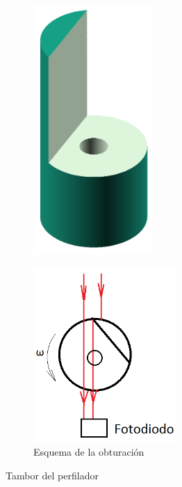 \begin{figure}[H]
    \begin{subfigure}[b]{0.45\textwidth}
        \centering
        \includegraphics[width=0.5\textwidth]{fig/perfilador/tambor}
        \caption{}
        \label{fig:perfilador/tambor}
    \end{subfigure}
    \begin{subfigure}[b]{0.45\textwidth}
        \centering
        \includegraphics[width=0.6\textwidth]{fig/perfilador/corte_tambor}
        \caption{Esquema de la obturación}
        \label{fig:perfilador/corte_tambor}
    \end{subfigure}
    \caption{Tambor del perfilador}
\end{figure}

